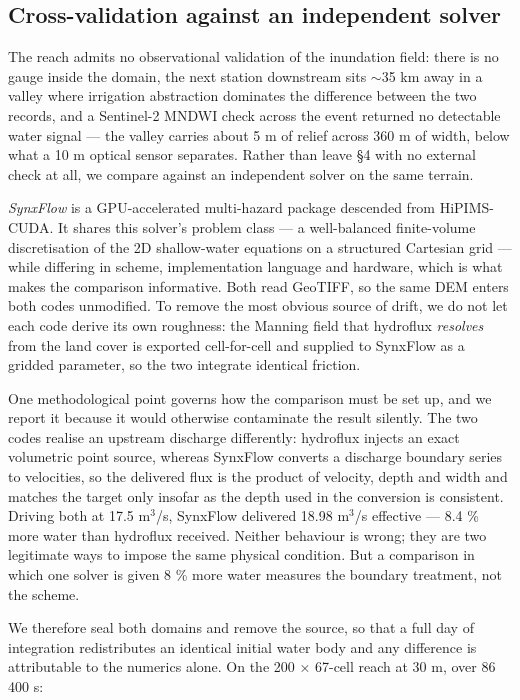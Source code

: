 \subsection{Cross-validation against an independent
solver}

The reach admits no observational validation of the inundation field:
there is no gauge inside the domain, the next station downstream sits
$\sim$35 km away in a valley where irrigation abstraction
dominates the difference between the two records, and a Sentinel-2 MNDWI
check across the event returned no detectable water signal --- the
valley carries about 5 m of relief across 360 m of width, below what a
10 m optical sensor separates. Rather than leave §4 with no external
check at all, we compare against an independent solver on the same
terrain.

\emph{SynxFlow} \citep{Xia2025} is a GPU-accelerated multi-hazard
package descended from HiPIMS-CUDA. It shares this solver's problem
class --- a well-balanced finite-volume discretisation of the 2D
shallow-water equations on a structured Cartesian grid --- while
differing in scheme, implementation language and hardware, which is what
makes the comparison informative. Both read GeoTIFF, so the same DEM
enters both codes unmodified. To remove the most obvious source of
drift, we do not let each code derive its own roughness: the Manning
field that hydroflux \emph{resolves} from the land cover is exported
cell-for-cell and supplied to SynxFlow as a gridded parameter, so the
two integrate identical friction.

One methodological point governs how the comparison must be set up, and
we report it because it would otherwise contaminate the result silently.
The two codes realise an upstream discharge differently: hydroflux
injects an exact volumetric point source, whereas SynxFlow converts a
discharge boundary series to velocities, so the delivered flux is the
product of velocity, depth and width and matches the target only insofar
as the depth used in the conversion is consistent. Driving both at 17.5
m$^{3}$/s, SynxFlow delivered 18.98 m$^{3}$/s effective --- 8.4 \% more water than
hydroflux received. Neither behaviour is wrong; they are two legitimate
ways to impose the same physical condition. But a comparison in which
one solver is given 8 \% more water measures the boundary treatment, not
the scheme.

We therefore seal both domains and remove the source, so that a full day
of integration redistributes an identical initial water body and any
difference is attributable to the numerics alone. On the 200 × 67-cell
reach at 30 m, over 86 400 s:

